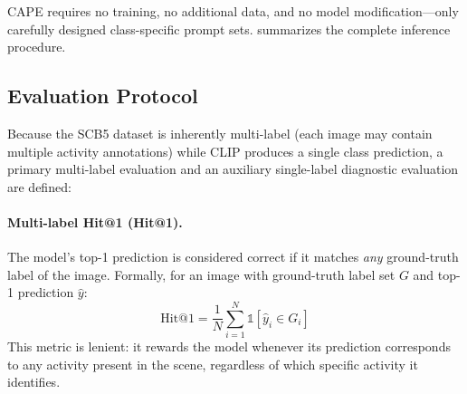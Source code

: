 \documentclass[electronics,article,submit,pdftex,moreauthors]{Definitions/mdpi}
\begin{document}
CAPE requires no training, no additional data, and no model modification---only carefully designed class-specific prompt sets.
 summarizes the complete inference procedure.

\begin{algorithm}[H]
\DontPrintSemicolon
\SetAlgoLined
{}
\BlankLine
{}
\BlankLine
{}
\caption{CAPE: Class-Aware Prompt Ensemble Inference}
\label{alg:cape}
\end{algorithm}



\subsection{Evaluation Protocol}
\label{sec:eval_protocol}

Because the SCB5 dataset is inherently multi-label (each image may contain multiple activity annotations) while CLIP produces a single class prediction, a primary multi-label evaluation and an auxiliary single-label diagnostic evaluation are defined:

\paragraph{Multi-label Hit@1 (Hit@1).}
The model's top-1 prediction is considered correct if it matches \emph{any} ground-truth label of the image.
Formally, for an image with ground-truth label set $G$ and top-1 prediction $\hat{y}$:
\begin{equation}
\text{Hit@1} = \frac{1}{N}\sum_{i=1}^{N} \mathbb{1}[\hat{y}_i \in G_i]
\end{equation}
This metric is lenient: it rewards the model whenever its prediction corresponds to any activity present in the scene, regardless of which specific activity it identifies.
\end{document}

